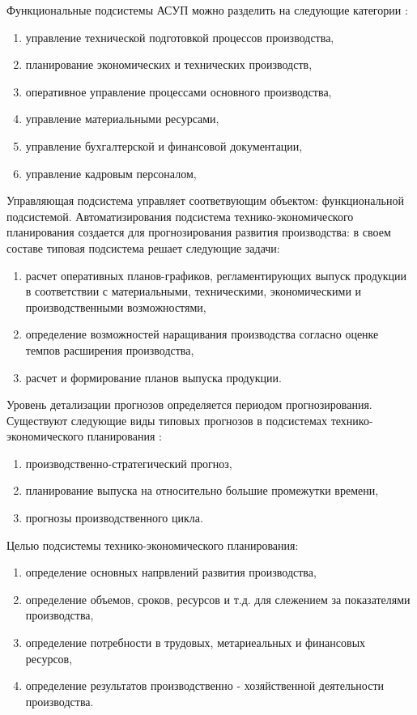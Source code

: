 Функциональные подсистемы АСУП можно разделить на следующие категории :
\begin{enumerate}
	\item управление технической подготовкой процессов производства,
	\item планирование экономических и технических производств,
	\item оперативное управление процессами основного производства,
	\item управление материальными ресурсами,
	\item управление бухгалтерской и финансовой документации,
	\item управление кадровым персоналом,
\end{enumerate}
Управляющая подсистема управляет соответвующим объектом: функциональной подсистемой.
Автоматизирования подсистема технико-экономического планирования создается для прогнозирования развития производства:
в своем составе типовая подсистема решает следующие задачи:
\begin{enumerate}
	\item расчет оперативных планов-графиков, регламентирующих выпуск продукции в соответствии с материальными, техническими, экономическими и производственными возможностями, 
	\item определение возможностей наращивания производства согласно оценке темпов расширения производства,
	\item расчет и формирование планов выпуска продукции.
\end{enumerate}
Уровень детализации прогнозов определяется периодом прогнозирования. Существуют следующие виды типовых прогнозов в подсистемах технико-экономического планирования :
\begin{enumerate}
	\item производственно-стратегический прогноз,
	\item планирование выпуска на относительно большие промежутки времени,
	\item прогнозы производственного цикла.
\end{enumerate} 
Целью подсистемы технико-экономического планирования:
\begin{enumerate}
	\item определение основных напрвлений развития производства,
	\item определение объемов, сроков, ресурсов и т.д. для слежением за показателями производства,
	\item определение потребности в трудовых, метариеальных и финансовых ресурсов,
	\item определение результатов производственно - хозяйственной деятельности производства.
\end{enumerate}
